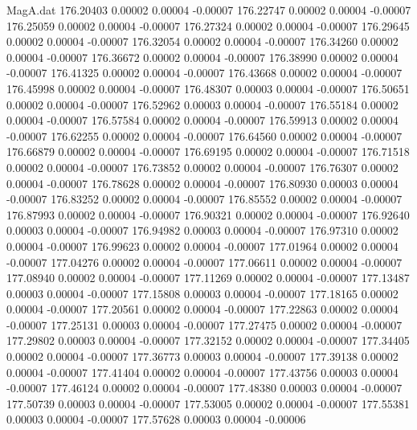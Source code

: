 \begin{filecontents}{MagA.dat}
 176.20403    0.00002    0.00004   -0.00007
 176.22747    0.00002    0.00004   -0.00007
 176.25059    0.00002    0.00004   -0.00007
 176.27324    0.00002    0.00004   -0.00007
 176.29645    0.00002    0.00004   -0.00007
 176.32054    0.00002    0.00004   -0.00007
 176.34260    0.00002    0.00004   -0.00007
 176.36672    0.00002    0.00004   -0.00007
 176.38990    0.00002    0.00004   -0.00007
 176.41325    0.00002    0.00004   -0.00007
 176.43668    0.00002    0.00004   -0.00007
 176.45998    0.00002    0.00004   -0.00007
 176.48307    0.00003    0.00004   -0.00007
 176.50651    0.00002    0.00004   -0.00007
 176.52962    0.00003    0.00004   -0.00007
 176.55184    0.00002    0.00004   -0.00007
 176.57584    0.00002    0.00004   -0.00007
 176.59913    0.00002    0.00004   -0.00007
 176.62255    0.00002    0.00004   -0.00007
 176.64560    0.00002    0.00004   -0.00007
 176.66879    0.00002    0.00004   -0.00007
 176.69195    0.00002    0.00004   -0.00007
 176.71518    0.00002    0.00004   -0.00007
 176.73852    0.00002    0.00004   -0.00007
 176.76307    0.00002    0.00004   -0.00007
 176.78628    0.00002    0.00004   -0.00007
 176.80930    0.00003    0.00004   -0.00007
 176.83252    0.00002    0.00004   -0.00007
 176.85552    0.00002    0.00004   -0.00007
 176.87993    0.00002    0.00004   -0.00007
 176.90321    0.00002    0.00004   -0.00007
 176.92640    0.00003    0.00004   -0.00007
 176.94982    0.00003    0.00004   -0.00007
 176.97310    0.00002    0.00004   -0.00007
 176.99623    0.00002    0.00004   -0.00007
 177.01964    0.00002    0.00004   -0.00007
 177.04276    0.00002    0.00004   -0.00007
 177.06611    0.00002    0.00004   -0.00007
 177.08940    0.00002    0.00004   -0.00007
 177.11269    0.00002    0.00004   -0.00007
 177.13487    0.00003    0.00004   -0.00007
 177.15808    0.00003    0.00004   -0.00007
 177.18165    0.00002    0.00004   -0.00007
 177.20561    0.00002    0.00004   -0.00007
 177.22863    0.00002    0.00004   -0.00007
 177.25131    0.00003    0.00004   -0.00007
 177.27475    0.00002    0.00004   -0.00007
 177.29802    0.00003    0.00004   -0.00007
 177.32152    0.00002    0.00004   -0.00007
 177.34405    0.00002    0.00004   -0.00007
 177.36773    0.00003    0.00004   -0.00007
 177.39138    0.00002    0.00004   -0.00007
 177.41404    0.00002    0.00004   -0.00007
 177.43756    0.00003    0.00004   -0.00007
 177.46124    0.00002    0.00004   -0.00007
 177.48380    0.00003    0.00004   -0.00007
 177.50739    0.00003    0.00004   -0.00007
 177.53005    0.00002    0.00004   -0.00007
 177.55381    0.00003    0.00004   -0.00007
 177.57628    0.00003    0.00004   -0.00006

\end{filecontents}
